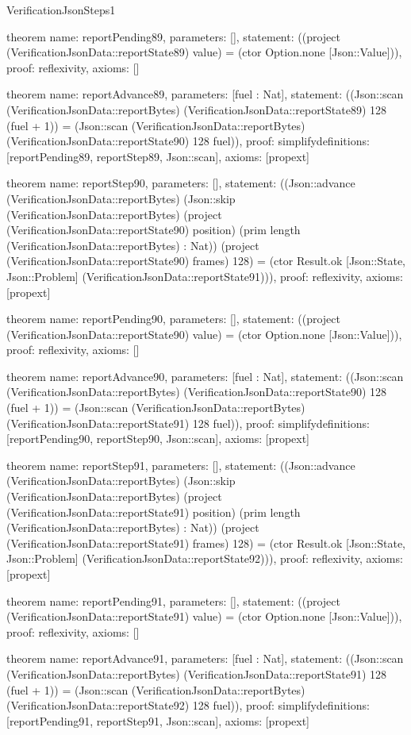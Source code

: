 \begin{lexlean}{VerificationJsonSteps1}
\begin{semanticmodule}
theorem{
  name: reportPending89,
  parameters: [],
  statement: ((project (VerificationJsonData::reportState89) value) = (ctor Option.none [Json::Value])),
  proof: reflexivity{},
  axioms: []
}

theorem{
  name: reportAdvance89,
  parameters: [fuel : Nat],
  statement: ((Json::scan (VerificationJsonData::reportBytes) (VerificationJsonData::reportState89) 128 (fuel + 1)) = (Json::scan (VerificationJsonData::reportBytes) (VerificationJsonData::reportState90) 128 fuel)),
  proof: simplify{definitions: [reportPending89, reportStep89, Json::scan]},
  axioms: [propext]
}

theorem{
  name: reportStep90,
  parameters: [],
  statement: ((Json::advance (VerificationJsonData::reportBytes) (Json::skip (VerificationJsonData::reportBytes) (project (VerificationJsonData::reportState90) position) (prim length (VerificationJsonData::reportBytes) : Nat)) (project (VerificationJsonData::reportState90) frames) 128) = (ctor Result.ok [Json::State, Json::Problem] (VerificationJsonData::reportState91))),
  proof: reflexivity{},
  axioms: [propext]
}

theorem{
  name: reportPending90,
  parameters: [],
  statement: ((project (VerificationJsonData::reportState90) value) = (ctor Option.none [Json::Value])),
  proof: reflexivity{},
  axioms: []
}

theorem{
  name: reportAdvance90,
  parameters: [fuel : Nat],
  statement: ((Json::scan (VerificationJsonData::reportBytes) (VerificationJsonData::reportState90) 128 (fuel + 1)) = (Json::scan (VerificationJsonData::reportBytes) (VerificationJsonData::reportState91) 128 fuel)),
  proof: simplify{definitions: [reportPending90, reportStep90, Json::scan]},
  axioms: [propext]
}

theorem{
  name: reportStep91,
  parameters: [],
  statement: ((Json::advance (VerificationJsonData::reportBytes) (Json::skip (VerificationJsonData::reportBytes) (project (VerificationJsonData::reportState91) position) (prim length (VerificationJsonData::reportBytes) : Nat)) (project (VerificationJsonData::reportState91) frames) 128) = (ctor Result.ok [Json::State, Json::Problem] (VerificationJsonData::reportState92))),
  proof: reflexivity{},
  axioms: [propext]
}

theorem{
  name: reportPending91,
  parameters: [],
  statement: ((project (VerificationJsonData::reportState91) value) = (ctor Option.none [Json::Value])),
  proof: reflexivity{},
  axioms: []
}

theorem{
  name: reportAdvance91,
  parameters: [fuel : Nat],
  statement: ((Json::scan (VerificationJsonData::reportBytes) (VerificationJsonData::reportState91) 128 (fuel + 1)) = (Json::scan (VerificationJsonData::reportBytes) (VerificationJsonData::reportState92) 128 fuel)),
  proof: simplify{definitions: [reportPending91, reportStep91, Json::scan]},
  axioms: [propext]
}


\end{semanticmodule}
\end{lexlean}
